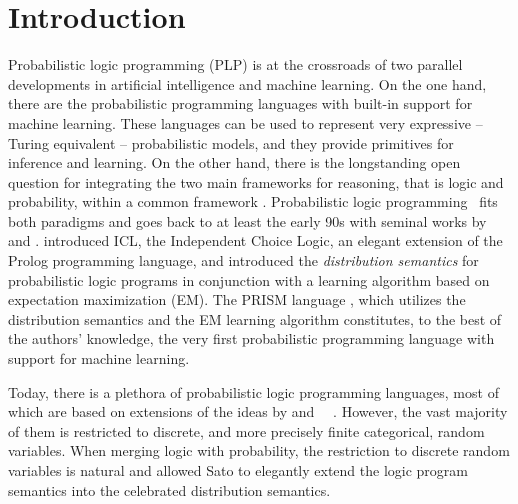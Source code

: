 \section{Introduction}
\label{sec:introduction}

Probabilistic logic programming (PLP) is at the crossroads of two parallel developments in artificial intelligence and machine learning.
On the one hand, there are the probabilistic programming languages with built-in support for machine learning. These languages can be used to represent very expressive -- Turing equivalent
-- probabilistic models, and they provide primitives for inference and learning.
On the other hand, there is the longstanding open question for integrating the two main frameworks
for reasoning, that is logic and probability, within a common framework \citep{russell2015unifying,deraedt:mc16}.
Probabilistic logic programming~\citep{de2015probabilistic,riguzzi2018foundations} fits both paradigms and goes back to at least the early 90s
with seminal works by \citet{sato1995statistical} and \citet{poole1993probabilistic}. 
\citeauthor{poole1993probabilistic} introduced ICL, the Independent Choice Logic, an elegant
extension of the Prolog programming language, and \citeauthor{sato1995statistical} introduced
the {\em distribution semantics} for probabilistic logic programs in conjunction with a learning algorithm based on expectation maximization (EM).
The PRISM language \citep{sato1995statistical}, which utilizes the distribution semantics and the EM learning algorithm constitutes, to the best of the authors' knowledge, the very first probabilistic programming language with support for machine learning.


Today, there is a plethora of probabilistic logic programming languages, most of which are based
on extensions of the ideas by \citeauthor{sato1995statistical} and~\citeauthor{poole1993probabilistic} ~\citep{sato1997prism,kersting2000bayesian,vennekens2004logic,de2007problog}. However, the vast majority of them is restricted to discrete, and more precisely finite categorical, random variables. 
When merging logic with probability, the restriction to discrete random variables
is natural and allowed Sato to elegantly extend the logic program semantics
into the celebrated distribution semantics.   




